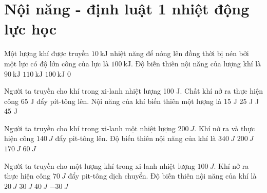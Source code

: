 \section{Nội năng - định luật 1 nhiệt động lực học}
\begin{ex}
	Một lượng khí được truyền \(10 \ \text{kJ}\) nhiệt năng để nóng lên đồng thời bị nén bởi một lực có độ lớn công của lực là \(100 \ \text{kJ}\). Độ biến thiên nội năng của lượng khí là
	\choice
	{$90 \ \text{kJ}$}
	{\True $110 \ \text{kJ}$}
	{$100 \ \text{kJ}$}
	{0}
\end{ex}
\begin{ex}%
	Người ta truyền cho khí trong xi-lanh nhiệt lượng 100 J. Chất khí nở ra thực hiện công 65 J đẩy pít-tông lên. Nội năng của khí biến thiên một lượng là
	\choice
	{15 J}
	{25 J}
	{ J}
	{45 J}
	\end{ex}
\begin{ex} 
	Người ta truyền cho khí trong xi-lanh một nhiệt lượng $200 \ J$. Khí nở ra và thực hiện công $140 \ J$ đẩy pit-tông lên. Độ biến thiên nội năng của khí là
	\choice
	{$340 \ J$}
	{$200 \ J$}
	{$170 \ J$}
	{\True $60 \ J$}
\end{ex}
\begin{ex} 
	Người ta truyền cho một lượng khí trong xi-lanh nhiệt lượng $100\ J$. Khí nở ra thực hiện công $70\ J$ đẩy pit-tông dịch chuyển. Độ biến thiên nội năng của khí là
	\choice
	{$20\ J$}
	{\True $30\ J$}
	{$40\ J$}
	{$-30\ J$}
\end{ex}
